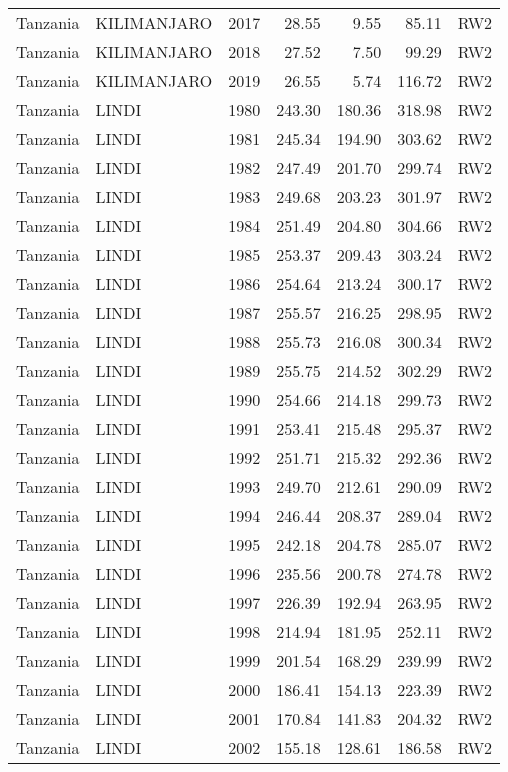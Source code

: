 \begin{longtable}{lllrrrl}
  Tanzania & KILIMANJARO & 2017 & 28.55 & 9.55 & 85.11 & RW2 \\ 
  Tanzania & KILIMANJARO & 2018 & 27.52 & 7.50 & 99.29 & RW2 \\ 
  Tanzania & KILIMANJARO & 2019 & 26.55 & 5.74 & 116.72 & RW2 \\ 
  Tanzania & LINDI & 1980 & 243.30 & 180.36 & 318.98 & RW2 \\ 
  Tanzania & LINDI & 1981 & 245.34 & 194.90 & 303.62 & RW2 \\ 
  Tanzania & LINDI & 1982 & 247.49 & 201.70 & 299.74 & RW2 \\ 
  Tanzania & LINDI & 1983 & 249.68 & 203.23 & 301.97 & RW2 \\ 
  Tanzania & LINDI & 1984 & 251.49 & 204.80 & 304.66 & RW2 \\ 
  Tanzania & LINDI & 1985 & 253.37 & 209.43 & 303.24 & RW2 \\ 
  Tanzania & LINDI & 1986 & 254.64 & 213.24 & 300.17 & RW2 \\ 
  Tanzania & LINDI & 1987 & 255.57 & 216.25 & 298.95 & RW2 \\ 
  Tanzania & LINDI & 1988 & 255.73 & 216.08 & 300.34 & RW2 \\ 
  Tanzania & LINDI & 1989 & 255.75 & 214.52 & 302.29 & RW2 \\ 
  Tanzania & LINDI & 1990 & 254.66 & 214.18 & 299.73 & RW2 \\ 
  Tanzania & LINDI & 1991 & 253.41 & 215.48 & 295.37 & RW2 \\ 
  Tanzania & LINDI & 1992 & 251.71 & 215.32 & 292.36 & RW2 \\ 
  Tanzania & LINDI & 1993 & 249.70 & 212.61 & 290.09 & RW2 \\ 
  Tanzania & LINDI & 1994 & 246.44 & 208.37 & 289.04 & RW2 \\ 
  Tanzania & LINDI & 1995 & 242.18 & 204.78 & 285.07 & RW2 \\ 
  Tanzania & LINDI & 1996 & 235.56 & 200.78 & 274.78 & RW2 \\ 
  Tanzania & LINDI & 1997 & 226.39 & 192.94 & 263.95 & RW2 \\ 
  Tanzania & LINDI & 1998 & 214.94 & 181.95 & 252.11 & RW2 \\ 
  Tanzania & LINDI & 1999 & 201.54 & 168.29 & 239.99 & RW2 \\ 
  Tanzania & LINDI & 2000 & 186.41 & 154.13 & 223.39 & RW2 \\ 
  Tanzania & LINDI & 2001 & 170.84 & 141.83 & 204.32 & RW2 \\ 
  Tanzania & LINDI & 2002 & 155.18 & 128.61 & 186.58 & RW2 \\ 

\end{longtable}

